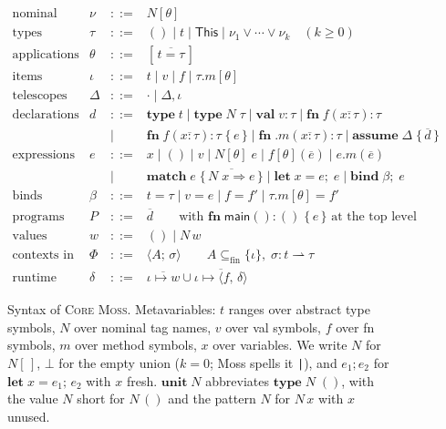 \documentclass[10pt]{article}
\newcommand{\ov}[1]{\overline{#1}}
\newcommand{\kw}[1]{\mathbf{#1}}          %
\newcommand{\ksf}[1]{\mathsf{#1}}         %
\newcommand{\This}{\ksf{This}}
\newcommand{\emptytel}{\cdot}
\newcommand{\clo}[2]{\langle #1,\, #2\rangle}
\newcommand{\unitv}{()}
\theoremstyle{plain}
\theoremstyle{remark}
\begin{document}
\begin{figure}[t]
\[
\begin{array}{llcl}
\text{nominal refs} & \nu & ::= & N[\theta] \\
\text{types} & \tau & ::= & \unitv \mid t \mid \This \mid
  \nu_1 \vee \cdots \vee \nu_k \quad (k \ge 0) \\
\text{applications} & \theta & ::= & [\,\ov{t = \tau}\,] \\[4pt]
\text{items} & \iota & ::= & t \mid v \mid f \mid \tau.m[\theta] \\
\text{telescopes} & \Delta & ::= & \emptytel \mid \Delta, \iota \\[4pt]
\text{declarations} & d & ::= &
    \kw{type}\;t
  \mid \kw{type}\;N\;\tau
  \mid \kw{val}\;v : \tau
  \mid \kw{fn}\;f(\ov{x : \tau}) : \tau \\
& & \mid & \kw{fn}\;f(\ov{x : \tau}) : \tau \;\{\,e\,\}
  \mid \kw{fn}\;.m(\ov{x : \tau}) : \tau
  \mid \kw{assume}\;\Delta\;\{\,\ov{d}\,\} \\[4pt]
\text{expressions} & e & ::= &
    x \mid \unitv \mid v
  \mid N[\theta]\;e
  \mid f[\theta](\ov{e})
  \mid e.m(\ov{e}) \\
& & \mid & \kw{match}\;e\;\{\,\ov{N\;x \Rightarrow e}\,\}
  \mid \kw{let}\;x = e;\; e
  \mid \kw{bind}\;\beta;\; e \\[2pt]
\text{binds} & \beta & ::= &
    t = \tau \mid v = e \mid f = f' \mid \tau.m[\theta] = f' \\[4pt]
\text{programs} & P & ::= & \ov{d}
  \qquad\text{with } \kw{fn}\;\ksf{main}() : \unitv\;\{\,e\,\} \text{ at the top level} \\[4pt]
\text{values} & w & ::= & \unitv \mid N\,w \\
\text{contexts in force} & \Phi & ::= & \langle A ;\, \sigma \rangle
  \qquad A \subseteq_{\mathrm{fin}} \{\iota\},\;
  \sigma : t \rightharpoonup \tau \\
\text{runtime contexts} & \delta & ::= &
  \ov{\iota \mapsto w} \cup \ov{\iota \mapsto \clo{f}{\delta}}
\end{array}
\]
\caption{Syntax of \textsc{Core Moss}. Metavariables: $t$ ranges over
abstract type symbols, $N$ over nominal tag names, $v$ over val symbols,
$f$ over fn symbols, $m$ over method symbols, $x$ over variables. We
write $N$ for $N[\,]$, $\bot$ for the empty union ($k=0$; Moss spells it
\texttt{|}), and $e_1; e_2$ for $\kw{let}\;x = e_1;\,e_2$ with $x$ fresh.
$\kw{unit}\;N$ abbreviates $\kw{type}\;N\;\unitv$, with the value $N$
short for $N\,\unitv$ and the pattern $N$ for $N\,x$ with $x$ unused.}
\label{fig:syntax}
\end{figure}
\end{document}
